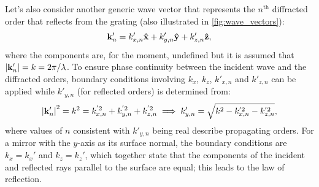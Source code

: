 \documentclass{article}
\begin{document}
Let's also consider another generic wave vector that represents the $n^{\text{th}}$ diffracted order that reflects from the grating (also illustrated in \cref{fig:wave_vectors}):
\begin{equation}
    \vb{k}'_n = k'_{x,n} \vu{x} + k'_{y,n} \vu{y} + k'_{z,n} \vu{z} ,
\end{equation}
where the components are, for the moment, undefined but it is assumed that $\abs{\vb{k}'_n} = k = 2 \pi / \lambda$.
To ensure phase continuity between the incident wave and the diffracted orders, boundary conditions involving $k_x$, $k_z$, $k'_{x,n}$ and $k'_{z,n}$ can be applied while $k'_{y,n}$ (for reflected orders) is determined from:
\begin{equation}\label{eq:wave_mag}
    \abs{\vb{k}'_n}^2 = k^2 = k^{'2}_{x,n} + k^{'2}_{y,n} + k^{'2}_{z,n} \implies k'_{y,n} = \sqrt{k^2 - k^{'2}_{x,n} - k^{'2}_{z,n}} ,
\end{equation}
where values of $n$ consistent with $k'_{y,n}$ being real describe propagating orders. 
For a mirror with the $y$-axis as its surface normal, the boundary conditions are $k_x = k_x'$ and $k_z = k_z'$, which together state that the components of the incident and reflected rays parallel to the surface are equal; this leads to the law of reflection. 
\end{document}
